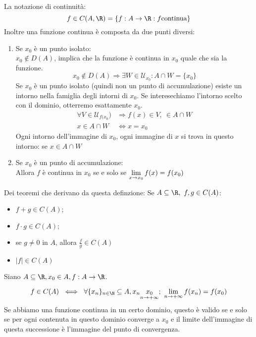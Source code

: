\documentclass[../analisi.tex]{subfiles}
\begin{document}
La notazione di continuità:
\begin{equation}
	f \in C(A,\R) = \{ f: A \to \R: f \text{continua} \}
\end{equation}
Inoltre una funzione continua è composta da due punti diversi:

\begin{enumerate}
	\item Se $x_0$ è un punto isolato:\\
		$x_0 \notin D(A)$, implica che la funzione è continua in $x_0$
		quale che sia la funzione.\\

		\begin{equation}
			x_0 \notin D(A) \Longrightarrow \exists W \in
			\mathcal{U}_{x_0} : A \cap W = \{ x_0 \}
		\end{equation}
		Se $x_0$ è un punto isolato (quindi non un punto di accumulazione)
		esiste un intorno nella famiglia degli intorni di $x_0$. Se 
		interesechiamo l'intorno scelto con il dominio, otterremo 
		esattamente $x_0$.\\
		\begin{equation}
			\begin{aligned}
			\forall V \in \mathcal{U}_{f(x_0}) &\Longrightarrow
			f(x) \in V,\ \in A \cap W\\
			x \in A \cap W &\iff x = x_0
			\end{aligned}
		\end{equation}
		Ogni intorno dell'immagine di $x_0$, ogni immagine di $x$ si 
		trova in questo intorno: se $x \in A\cap W$
	\item Se $x_0$ è un punto di accumulazione:\\
		Allora $f$ è continua in $x_0$ se e solo se
		$\lim \limits_{x \to x_0} f(x) = f(x_0)$
\end{enumerate}
Dei teoremi che derivano da questa definzione:
Se $\acr,\ f,g \in C(A)$:
\begin{itemize}
	\item $f+g \in C(A)$;
	\item $f \cdot g \in C(A)$;
	\item se $g \neq 0$ in $A$, allora $\frac{f}{g} \in C(A)$ 
	\item $ | f | \in C (A)$
\end{itemize}

\begin{defn}
Siano $\acr, x_0 \in A, f: A \to \R$.

\begin{equation}
	f \in C(A)\ \iff\ \forall \{ x_n \}_{n \in \N} \subseteq
	A, x_n \underset{\nti}{x_0};\ \lim \limits_{\nti} f(x_n) = f(x_0)
\end{equation}
Se abbiamo una funzione continua in un certo dominio, questo è valido se 
e solo se per ogni  contenuta in questo dominio converge a
$x_0$ e il limite dell'immagine di questa successione è l'immagine del punto
di convergenza.
\end{defn}
\end{document}
